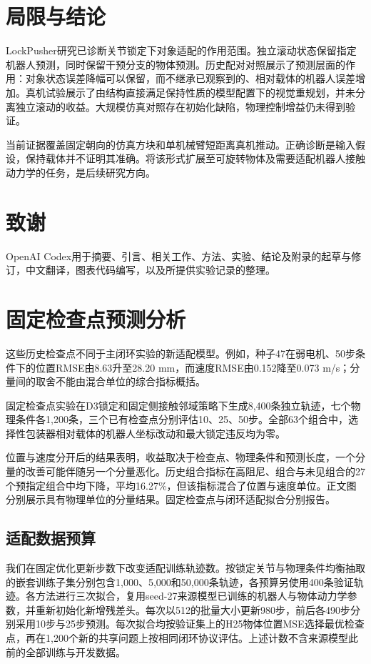 \documentclass[UTF8,a4paper,10pt,twocolumn]{ctexart}
\begin{document}
\section{局限与结论}
LockPusher研究已诊断关节锁定下对象适配的作用范围。独立滚动状态保留指定机器人预测，同时保留干预分支的物体预测。历史配对对照展示了预测层面的作用：对象状态误差降幅可以保留，而不继承已观察到的、相对载体的机器人误差增加。真机试验展示了由结构直接满足保持性质的模型配置下的视觉重规划，并未分离独立滚动的收益。大规模仿真对照存在初始化缺陷，物理控制增益仍未得到验证。

当前证据覆盖固定朝向的仿真方块和单机械臂短距离真机推动。正确诊断是输入假设，保持载体并不证明其准确。将该形式扩展至可旋转物体及需要适配机器人接触动力学的任务，是后续研究方向。

\section*{致谢}
OpenAI Codex用于摘要、引言、相关工作、方法、实验、结论及附录的起草与修订，中文翻译，图表代码编写，以及所提供实验记录的整理。

\renewcommand{\refname}{参考文献}


\appendix
\section{固定检查点预测分析}
这些历史检查点不同于主闭环实验的新适配模型。例如，种子47在弱电机、50步条件下的位置RMSE由8.63升至28.20 mm，而速度RMSE由0.152降至0.073 m/s；分量间的取舍不能由混合单位的综合指标概括。


固定检查点实验在D3锁定和固定侧接触邻域策略下生成8,400条独立轨迹，七个物理条件各1,200条，三个已有检查点分别评估10、25、50步。全部63个组合中，选择性包装器相对载体的机器人坐标改动和最大锁定违反均为零。

位置与速度分开后的结果表明，收益取决于检查点、物理条件和预测长度，一个分量的改善可能伴随另一个分量恶化。历史组合指标在高阻尼、组合与未见组合的27个预指定组合中均下降，平均16.27\%，但该指标混合了位置与速度单位。正文图分别展示具有物理单位的分量结果。固定检查点与闭环适配拟合分别报告。

\subsection{适配数据预算}

我们在固定优化更新步数下改变适配训练轨迹数。按锁定关节与物理条件均衡抽取的嵌套训练子集分别包含1,000、5,000和50,000条轨迹，各预算另使用400条验证轨迹。各方法进行三次拟合，复用seed-27来源模型已训练的机器人与物体动力学参数，并重新初始化新增残差头。每次以512的批量大小更新980步，前后各490步分别采用10步与25步预测。每次拟合均按验证集上的H25物体位置MSE选择最优检查点，再在1,200个新的共享问题上按相同闭环协议评估。上述计数不含来源模型此前的全部训练与开发数据。
\end{document}
